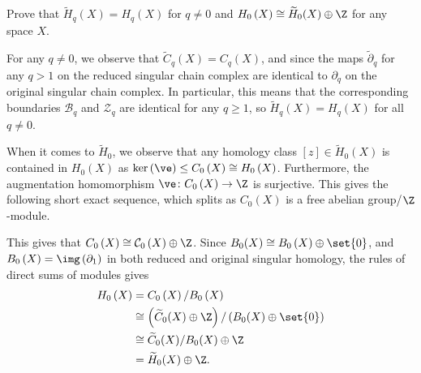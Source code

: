 \documentclass[10pt]{mypackage}
\begin{document}
\RaggedRight
\begin{problem}[Problem 1]
  Prove that $ \widetilde{H}_q(X) = H_q(X) $ for $q\neq 0$ and $H_0\left( X \right) \cong \widetilde{H}_0(X) \oplus \Z$ for any space $X$.
\end{problem}
\begin{solution}
  For any $q\neq 0$, we observe that $\widetilde{C}_q(X) = C_q(X)$, and since the maps $\widetilde{\partial}_{q}$ for any $q > 1$ on the reduced singular chain complex are identical to $\partial_q$ on the original singular chain complex. In particular, this means that the corresponding boundaries $ \mathcal{B}_q $ and $\mathcal{Z}_q$ are identical for any $q \geq 1$, so $ \widetilde{H}_q(X) = H_q(X) $ for all $q \neq 0$.

  When it comes to $\widetilde{H}_0$, we observe that any homology class $\left[ z \right]\in \widetilde{H}_0(X)$ is contained in $H_0(X)$ as $\ker\left( \ve \right)\leq C_0\left( X \right)\cong H_0\left( X \right)$. Furthermore, the augmentation homomorphism $\ve\colon C_0\left( X \right)\rightarrow \Z$ is surjective. This gives the following short exact sequence, which splits as $C_0(X)$ is a free abelian group/$\Z$-module.
  \begin{center}
  \end{center}
  This gives that $C_0\left( X \right)\cong \mathcal{C}_0\left( X \right)\oplus \Z$. Since $B_0(X)\cong B_0\left( X \right)\oplus \set{0}$, and $B_0\left( X \right) = \img\left( \partial_1 \right)$ in both reduced and original singular homology, the rules of direct sums of modules gives
  \begin{align*}
    H_0\left( X \right) &= C_0\left( X \right)/B_0\left( X \right)\\
                        &\cong \left( \widetilde{C}_0(X)\oplus \Z \right)/\left( B_0(X)\oplus \set{0} \right)\\
                        &\cong \widetilde{C}_0(X)/B_0(X)\oplus \Z\\
                        &= \widetilde{H}_0(X)\oplus \Z.
  \end{align*}
\end{solution}
\end{document}

